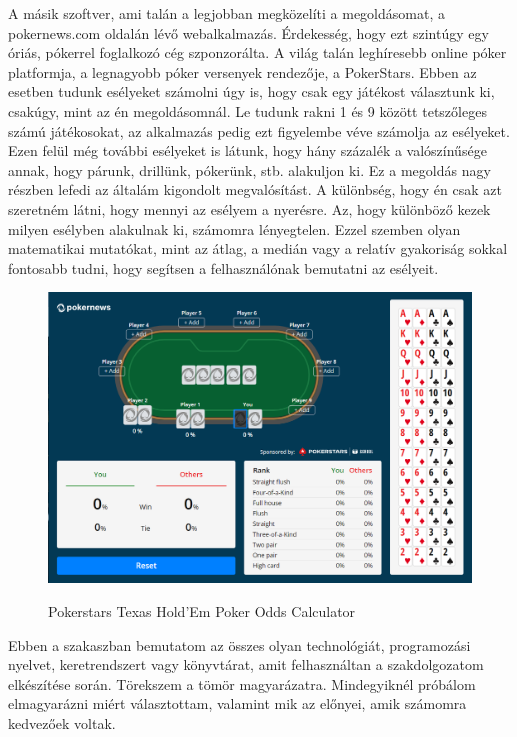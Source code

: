 A másik szoftver, ami talán a legjobban megközelíti a megoldásomat, a pokernews.com oldalán lévő webalkalmazás. Érdekesség, hogy ezt szintúgy egy óriás, pókerrel foglalkozó cég szponzorálta. A világ talán leghíresebb online póker platformja, a legnagyobb póker versenyek rendezője, a PokerStars. Ebben az esetben tudunk esélyeket számolni úgy is, hogy csak egy játékost választunk ki, csakúgy, mint az én megoldásomnál. Le tudunk rakni 1 és 9 között tetszőleges számú játékosokat, az alkalmazás pedig ezt figyelembe véve számolja az esélyeket. Ezen felül még további esélyeket is látunk, hogy hány százalék a valószínűsége annak, hogy párunk, drillünk, pókerünk, stb. alakuljon ki. Ez a megoldás nagy részben lefedi az általám kigondolt megvalósítást. A különbség, hogy én csak azt szeretném látni, hogy mennyi az esélyem a nyerésre. Az, hogy különböző kezek milyen esélyben alakulnak ki, számomra lényegtelen. Ezzel szemben olyan matematikai mutatókat, mint az átlag, a medián vagy a relatív gyakoriság sokkal fontosabb tudni, hogy segítsen a felhasználónak bemutatni az esélyeit\cite{harrington}.

\begin{figure}[h!]
\centering
\includegraphics[scale=0.5]{images/pokerstars.png}
\caption{Pokerstars Texas Hold'Em Poker Odds Calculator}
\cite{pokerstars}
\label{fig:pokerstars}
\end{figure}

Ebben a szakaszban bemutatom az összes olyan technológiát, programozási nyelvet, keretrendszert vagy könyvtárat, amit felhasználtan a szakdolgozatom elkészítése során. Törekszem a tömör magyarázatra. Mindegyiknél próbálom elmagyarázni miért választottam, valamint mik az előnyei, amik számomra kedvezőek voltak.


